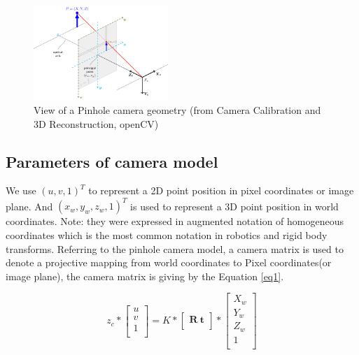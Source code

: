 \begin{figure}[!h]
\begin{center}
\includegraphics[width=2in]{figures02/pinhole_camera_model.png}
\caption{View of a Pinhole camera geometry (from Camera Calibration and 3D Reconstruction, openCV)}%
\end{center}
\end{figure}

\subsection{Parameters of camera model}
We use $(u,v,1)^{T}$ to represent a 2D point position in pixel coordinates or image plane. And $(x_{w},y_{w},z_{w},1)^{T}$ is used to represent a 3D point position in world coordinates. Note: they were expressed in augmented notation of homogeneous coordinates which is the most common notation in robotics and rigid body transforms. Referring to the pinhole camera model, a camera matrix is used to denote a projective mapping from world coordinates  to Pixel coordinates(or image plane), the camera matrix is giving by the Equation \ref{eq1}.

\begin{equation}\label{eq1}
z_{c}*
\left[ {\begin{array}{c}
u \\
v \\
1 \\
\end{array} } \right]
= K*
\left[ {\begin{array}{c}
\textbf{R} \ \textbf{t} \\
\end{array} } \right]
*\left[ {\begin{array}{c}
X_{w}\\
Y_{w} \\
Z_{w} \\
1\\
\end{array} } \right]\end{equation}




